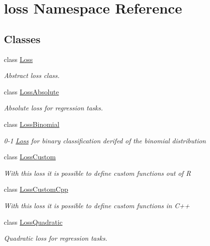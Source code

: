 \hypertarget{namespaceloss}{}\section{loss Namespace Reference}
\label{namespaceloss}
\subsection*{Classes}
\begin{DoxyCompactItemize}
\item 
class \hyperlink{classloss_1_1_loss}{Loss}
\begin{DoxyCompactList}\small\item\em Abstract loss class. \end{DoxyCompactList}\item 
class \hyperlink{classloss_1_1_loss_absolute}{Loss\+Absolute}
\begin{DoxyCompactList}\small\item\em Absolute loss for regression tasks. \end{DoxyCompactList}\item 
class \hyperlink{classloss_1_1_loss_binomial}{Loss\+Binomial}
\begin{DoxyCompactList}\small\item\em 0-\/1 \hyperlink{classloss_1_1_loss}{Loss} for binary classification derifed of the binomial distribution \end{DoxyCompactList}\item 
class \hyperlink{classloss_1_1_loss_custom}{Loss\+Custom}
\begin{DoxyCompactList}\small\item\em With this loss it is possible to define custom functions out of {\ttfamily R} \end{DoxyCompactList}\item 
class \hyperlink{classloss_1_1_loss_custom_cpp}{Loss\+Custom\+Cpp}
\begin{DoxyCompactList}\small\item\em With this loss it is possible to define custom functions in {\ttfamily C++} \end{DoxyCompactList}\item 
class \hyperlink{classloss_1_1_loss_quadratic}{Loss\+Quadratic}
\begin{DoxyCompactList}\small\item\em Quadratic loss for regression tasks. \end{DoxyCompactList}\end{DoxyCompactItemize}
